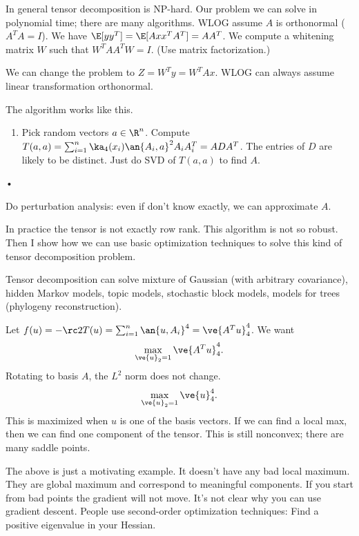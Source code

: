 In general tensor decomposition is NP-hard. Our problem we can solve in polynomial time; there are many algorithms. WLOG assume $A$ is orthonormal ($A^TA=I$). We have $\E[yy^T]=\E[Axx^TA^T]=AA^T$. We compute a whitening matrix $W$ such that $W^TAA^TW=I$. (Use matrix factorization.)

We can change the problem to $Z=W^Ty = W^TAx$. %
WLOG can always assume linear transformation orthonormal.

The algorithm works like this.
\begin{enumerate}
\item
Pick random vectors $a\in \R^n$. 
Compute $T(a,a)= \sum_{i=1}^n \ka_4(x_i)\an{A_i,a}^2 A_iA_i^T = ADA^T$. 
The entries of $D$ are likely to be distinct. Just do SVD of $T(a,a)$ to find $A$.
\end{enumerate}•

Do perturbation analysis: even if don't know exactly, we can approximate $A$. 

In practice the tensor is not exactly row rank. This algorithm is not so robust. Then I show how we can use basic optimization techniques to solve this kind of tensor decomposition problem. 

Tensor decomposition can solve mixture of Gaussian (with arbitrary covariance), hidden Markov models, topic models, stochastic block models, models for trees (phylogeny reconstruction). 


Let $f(u)=-\rc 2 T(u) =\sum_{i=1}^n \an{u,A_i}^4 = \ve{A^T u}_4^4$. We want
\[
\max_{\ve{u}_2=1} \ve{A^Tu}_4^4.
\]
Rotating to basis $A$, the $L^2$ norm does not change. 
\[
\max_{\ve{u}_2=1} \ve{u}_4^4.
\]
This is maximized when $u$ is one of the basis vectors. If we can find a local max, then we can find one component of the tensor. 
This is still nonconvex; there are many saddle points. 

The above is just a motivating example. It doesn't have any bad local maximum. They are global maximum and correspond to meaningful components.
If you start from bad points the gradient will not move. It's not clear why you can use gradient descent. People use second-order optimization techniques: Find a positive eigenvalue in your Hessian.

